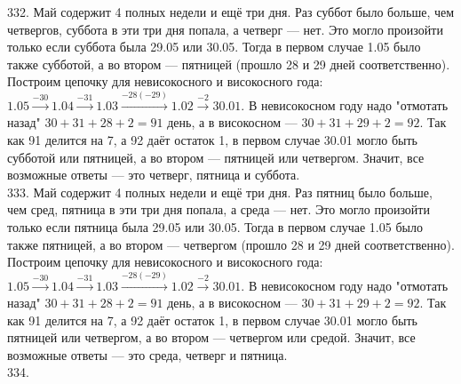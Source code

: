 \documentclass[12pt]{article}
\begin{document}
332. Май содержит 4 полных недели и ещё три дня. Раз суббот было больше, чем четвергов, суббота в эти три дня попала, а четверг --- нет. Это могло произойти только если суббота была 29.05 или 30.05. Тогда в первом случае 1.05 было также субботой, а во втором --- пятницей (прошло 28 и 29 дней соответственно). Построим цепочку для невисокосного и високосного года: $1.05\stackrel{-30}{\rightarrow}1.04\stackrel{-31}{\rightarrow}1.03
\stackrel{-28(-29)}{\rightarrow}1.02\stackrel{-2}{\rightarrow}30.01.$
В невисокосном году надо "отмотать назад" $30+31+28+2=91$ день, а в високосном --- $30+31+29+2=92.$ Так как 91 делится на 7, а 92 даёт остаток 1, в первом случае 30.01 могло быть субботой или пятницей, а во втором --- пятницей или четвергом. Значит, все возможные ответы --- это четверг, пятница и суббота.\\
333. Май содержит 4 полных недели и ещё три дня. Раз пятниц было больше, чем сред, пятница в эти три дня попала, а среда --- нет. Это могло произойти только если пятница была 29.05 или 30.05. Тогда в первом случае 1.05 было также пятницей, а во втором --- четвергом (прошло 28 и 29 дней соответственно). Построим цепочку для невисокосного и високосного года: $1.05\stackrel{-30}{\rightarrow}1.04\stackrel{-31}{\rightarrow}1.03
\stackrel{-28(-29)}{\rightarrow}1.02\stackrel{-2}{\rightarrow}30.01.$
В невисокосном году надо "отмотать назад" $30+31+28+2=91$ день, а в високосном --- $30+31+29+2=92.$ Так как 91 делится на 7, а 92 даёт остаток 1, в первом случае 30.01 могло быть пятницей или четвергом, а во втором --- четвергом или средой. Значит, все возможные ответы --- это среда, четверг и пятница.\\
334.\begin{figure}[ht!]
\end{figure}\\
\end{document}
